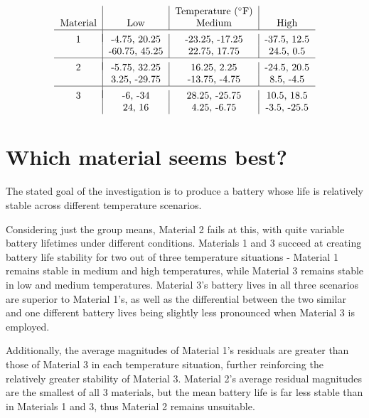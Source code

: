 \documentclass[]{article}
\begin{document}
\begin{displaymath}
    \begin{tabular}{c|c|c|c}
        &&Temperature ($^\circ$F)&\\
        Material&Low&Medium&High\\
        \hline\\
        [\dimexpr-\normalbaselineskip+4pt]
        1&-4.75, 20.25&-23.25, -17.25&-37.5, 12.5\\
        &-60.75, 45.25&22.75, 17.75&24.5, 0.5\\
        \hline\\
        [\dimexpr-\normalbaselineskip+4pt]
        2&-5.75, 32.25&16.25, 2.25&-24.5, 20.5\\
        &3.25, -29.75&-13.75, -4.75&8.5, -4.5\\
        \hline\\
        [\dimexpr-\normalbaselineskip+4pt]
        3&-6, -34&28.25, -25.75&10.5, 18.5\\
        &24, 16&4.25, -6.75&-3.5, -25.5
    \end{tabular}
\end{displaymath}

\section{Which material seems best?}
The stated goal of the investigation is to produce a battery whose life is relatively stable across different temperature scenarios.

Considering just the group means, Material 2 fails at this, with quite variable battery lifetimes under different conditions. Materials 1 and 3 succeed at creating battery life stability for two out of three temperature situations - Material 1 remains stable in medium and high temperatures, while Material 3 remains stable in low and medium temperatures. Material 3's battery lives in all three scenarios are superior to Material 1's, as well as the differential between the two similar and one different battery lives being slightly less pronounced when Material 3 is employed. 

Additionally, the average magnitudes of Material 1's residuals are greater than those of Material 3 in each temperature situation, further reinforcing the relatively greater stability of Material 3. Material 2's average residual magnitudes are the smallest of all 3 materials, but the mean battery life is far less stable than in Materials 1 and 3, thus Material 2 remains unsuitable.  
\end{document}
